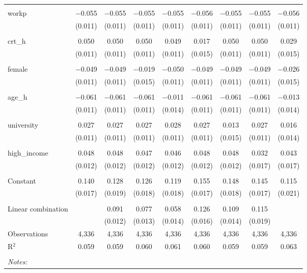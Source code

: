\begin{table}[!htbp]
\begin{tabular}{@{\extracolsep{5pt}}lcccccccc}
  & & & & & & & & \\ 
 workp & $-$0.055 & $-$0.055 & $-$0.055 & $-$0.055 & $-$0.056 & $-$0.055 & $-$0.055 & $-$0.056 \\ 
  & (0.011) & (0.011) & (0.011) & (0.011) & (0.011) & (0.011) & (0.011) & (0.011) \\ 
  & & & & & & & & \\ 
 crt\_h & 0.050 & 0.050 & 0.050 & 0.049 & 0.017 & 0.050 & 0.050 & 0.029 \\ 
  & (0.011) & (0.011) & (0.011) & (0.011) & (0.015) & (0.011) & (0.011) & (0.015) \\ 
  & & & & & & & & \\ 
 female & $-$0.049 & $-$0.049 & $-$0.019 & $-$0.050 & $-$0.049 & $-$0.049 & $-$0.049 & $-$0.026 \\ 
  & (0.011) & (0.011) & (0.015) & (0.011) & (0.011) & (0.011) & (0.011) & (0.015) \\ 
  & & & & & & & & \\ 
 age\_h & $-$0.061 & $-$0.061 & $-$0.061 & $-$0.011 & $-$0.061 & $-$0.061 & $-$0.061 & $-$0.013 \\ 
  & (0.011) & (0.011) & (0.011) & (0.014) & (0.011) & (0.011) & (0.011) & (0.014) \\ 
  & & & & & & & & \\ 
 university & 0.027 & 0.027 & 0.027 & 0.028 & 0.027 & 0.013 & 0.027 & 0.016 \\ 
  & (0.011) & (0.011) & (0.011) & (0.011) & (0.011) & (0.015) & (0.011) & (0.014) \\ 
  & & & & & & & & \\ 
 high\_income & 0.048 & 0.048 & 0.047 & 0.046 & 0.048 & 0.048 & 0.032 & 0.043 \\ 
  & (0.012) & (0.012) & (0.012) & (0.012) & (0.012) & (0.012) & (0.017) & (0.017) \\ 
  & & & & & & & & \\ 
 Constant & 0.140 & 0.128 & 0.126 & 0.119 & 0.155 & 0.148 & 0.145 & 0.115 \\ 
  & (0.017) & (0.019) & (0.018) & (0.018) & (0.017) & (0.018) & (0.017) & (0.021) \\ 
  & & & & & & & & \\ 
Linear combination &   & 0.091 & 0.077 & 0.058 & 0.126 & 0.109 & 0.115 &  \\ 
 &  & (0.012) & (0.013) & (0.014) & (0.016) & (0.014) & (0.019) &  \\ 
Observations & 4,336 & 4,336 & 4,336 & 4,336 & 4,336 & 4,336 & 4,336 & 4,336 \\ 
R$^{2}$ & 0.059 & 0.059 & 0.060 & 0.061 & 0.060 & 0.059 & 0.059 & 0.063 \\ 
\hline \\[-1.8ex] 
\textit{Notes:} & \multicolumn{8}{l}{} \\ 
\end{tabular} 
\end{table} 
